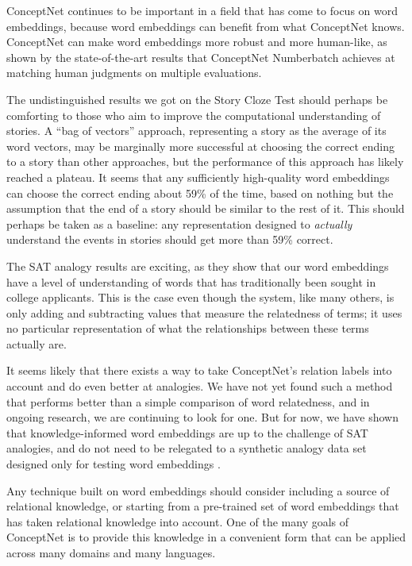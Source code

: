 \documentclass[letterpaper]{article}
\begin{document}
ConceptNet continues to be important in a field that has come to focus on word
embeddings, because word embeddings can benefit from what ConceptNet knows.
ConceptNet can make word embeddings more robust and more human-like, as shown
by the state-of-the-art results that ConceptNet Numberbatch achieves at
matching human judgments on multiple evaluations.

The undistinguished results we got on the Story Cloze Test should perhaps be
comforting to those who aim to improve the computational understanding of
stories.  A ``bag of vectors'' approach, representing a story as the average of
its word vectors, may be marginally more successful at choosing the correct
ending to a story than other approaches, but the performance of this approach
has likely reached a plateau. It seems that any sufficiently high-quality word
embeddings can choose the correct ending about 59\% of the time, based on
nothing but the assumption that the end of a story should be similar to the
rest of it. This should perhaps be taken as a baseline: any representation
designed to \emph{actually} understand the events in stories should get more
than 59\% correct.

The SAT analogy results are exciting, as they show that our word embeddings
have a level of understanding of words that has traditionally been sought in
college applicants. This is the case even though the system, like many others,
is only adding and subtracting values that measure the relatedness of terms; it
uses no particular representation of what the relationships between these terms
actually are.

It seems likely that there exists a way to take ConceptNet's relation labels
into account and do even better at analogies. We have not yet found such a
method that performs better than a simple comparison of word relatedness, and
in ongoing research, we are continuing to look for one. But for now, we have
shown that knowledge-informed word embeddings are up to the challenge of SAT
analogies, and do not need to be relegated to a synthetic analogy data set
designed only for testing word embeddings \cite{mikolov2013word2vec}.

Any technique built on word embeddings should
consider including a source of relational knowledge, or starting from a
pre-trained set of word embeddings that has taken relational knowledge into
account. One of the many goals of ConceptNet is to provide this knowledge in a
convenient form that can be applied across many domains and many languages.
\end{document}
